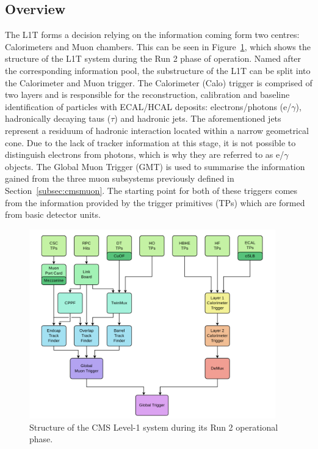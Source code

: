  \subsection{Overview}
 \label{l1:TTs}
 \hspace{10pt} The L1T forms a decision relying on the information coming form two centres: Calorimeters and Muon chambers. This can be seen in Figure~\ref{fig:l1_structure}, which shows the structure of the L1T system during the Run 2 phase of operation. Named after the corresponding information pool, the substructure of the L1T can be split into the Calorimeter and Muon trigger. The Calorimeter (Calo) trigger is comprised of two layers and is responsible for the reconstruction, calibration and baseline identification of particles with ECAL/HCAL deposits: electrons/photons (e/$\gamma$), hadronically decaying taus ($\tau$) and hadronic jets. The aforementioned jets represent a residuum of hadronic interaction located within a narrow geometrical cone. Due to the lack of tracker information at this stage, it is not possible to distinguish electrons from photons, which is why they are referred to as e/$\gamma$ objects. The Global Muon Trigger (GMT) is used to summarise the information gained from the three muon subsystems previously defined in Section~\ref{subsec:cmsmuon}. The starting point for both of these triggers comes from the information provided by the trigger primitives (TPs) which are formed from basic detector units.
\begin{figure}[htbp]
  \centering
    \includegraphics[width=0.95\textwidth]{CMS_experiment/L1_diagram.png}
  \caption{Structure of the CMS Level-1 system during its Run 2 operational phase.~\cite{cms:l1_paper}}
  \label{fig:l1_structure}
\end{figure}

